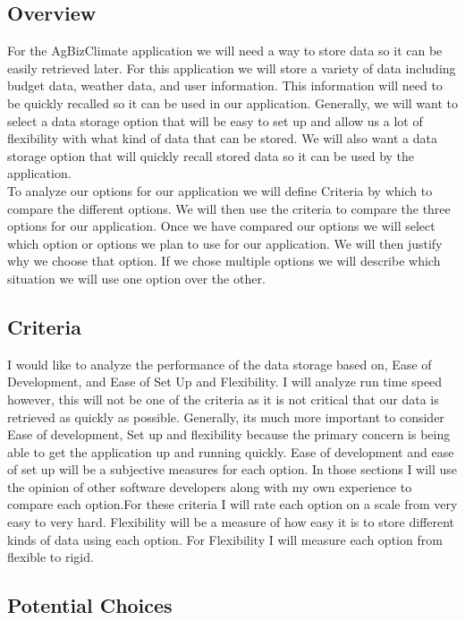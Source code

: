 \documentclass[letterpaper,10pt]{article}
\begin{document}
	\subsection{Overview}
		For the AgBizClimate application we will need a way to store data so it can be easily retrieved later. For this application we will store a variety of data including budget data, weather data, and user information. This information will need to be quickly recalled so it can be used in our application. Generally, we will want to select a data storage option that will be easy to set up and allow us a lot of flexibility with what kind of data that can be stored. We will also want a data storage option that will quickly recall stored data so it can be used by the application.\\
		To analyze our options for our application we will define Criteria by which to compare the different options. We will then use the criteria to compare the three options for our application. Once we have compared our options we will select which option or options we plan to use for our application. We will then justify why we choose that option. If we chose multiple options we will describe which situation we will use one option over the other.\\
	\subsection{Criteria}
		I would like to analyze the performance of the data storage based on, Ease of Development, and Ease of Set Up and Flexibility. I will analyze run time speed however, this will not be one of the criteria as it is not critical that our data is retrieved as quickly as possible. Generally, its much more important to consider Ease of development, Set up and flexibility because the primary concern is being able to get the application up and running quickly. Ease of development and ease of set up will be a subjective measures for each option. In those sections I will use the opinion of other software developers along with my own experience to compare each option.For these criteria I will rate each option on a scale from very easy to very hard. Flexibility will be a measure of how easy it is to store different kinds of data using each option. For Flexibility I will measure each option from flexible to rigid.
	\subsection{Potential Choices}
\end{document}
